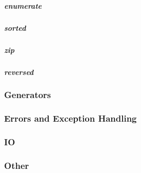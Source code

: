\subparagraph{enumerate}

\subparagraph{sorted}

\subparagraph{zip}

\subparagraph{reversed}

\subsubsection{Generators}

\subsubsection{Errors and Exception Handling}

\subsubsection{IO}

\subsubsection{Other}


